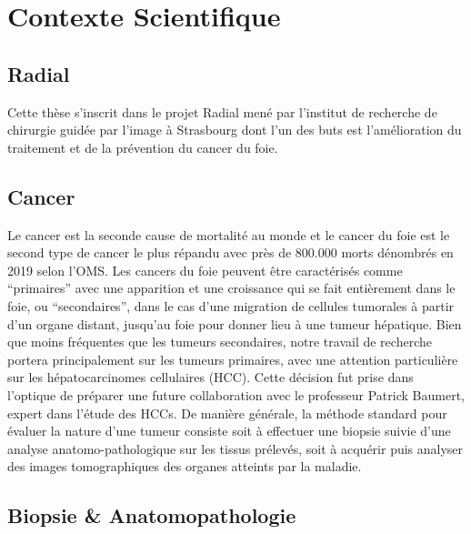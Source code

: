 \documentclass[]{memoir}
\begin{document}
\section{Contexte Scientifique}

\subsection{Radial}

Cette thèse s’inscrit dans le projet Radial mené par l'institut de recherche de chirurgie guidée par l’image à Strasbourg dont l’un des buts est l’amélioration du traitement et de la prévention du cancer du foie.

\subsection{Cancer}

Le cancer est la seconde cause de mortalité au monde et le cancer du foie est le second type
de cancer le plus répandu avec près de 800.000 morts dénombrés en 2019 selon l’OMS.
Les cancers du foie peuvent être caractérisés comme “primaires” avec une apparition et une croissance qui se fait entièrement dans le foie, ou “secondaires”, dans le cas d’une migration de cellules tumorales à partir d’un organe distant, jusqu’au foie pour donner lieu à une tumeur hépatique. 
Bien que moins fréquentes que les tumeurs secondaires, notre travail de recherche portera principalement sur les tumeurs primaires, avec une attention particulière sur les hépatocarcinomes cellulaires (HCC). Cette décision fut prise dans l’optique de préparer une future collaboration avec le professeur Patrick Baumert, expert dans l’étude des HCCs.
De manière générale, la méthode standard pour évaluer la nature d’une tumeur consiste soit à effectuer une biopsie suivie d’une analyse anatomo-pathologique sur les tissus prélevés, soit à acquérir puis analyser des images tomographiques des organes atteints par la maladie. 


\subsection{Biopsie \& Anatomopathologie}
\end{document}

